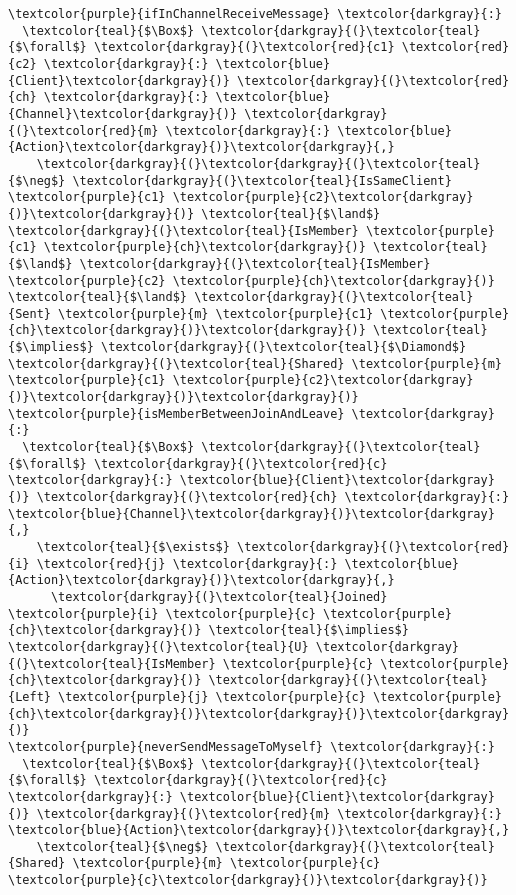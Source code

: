 \begin{Verbatim}[commandchars=\\\{\},codes={\catcode`$=3}]
\textcolor{purple}{ifInChannelReceiveMessage} \textcolor{darkgray}{:} 
  \textcolor{teal}{$\Box$} \textcolor{darkgray}{(}\textcolor{teal}{$\forall$} \textcolor{darkgray}{(}\textcolor{red}{c1} \textcolor{red}{c2} \textcolor{darkgray}{:} \textcolor{blue}{Client}\textcolor{darkgray}{)} \textcolor{darkgray}{(}\textcolor{red}{ch} \textcolor{darkgray}{:} \textcolor{blue}{Channel}\textcolor{darkgray}{)} \textcolor{darkgray}{(}\textcolor{red}{m} \textcolor{darkgray}{:} \textcolor{blue}{Action}\textcolor{darkgray}{)}\textcolor{darkgray}{,} 
    \textcolor{darkgray}{(}\textcolor{darkgray}{(}\textcolor{teal}{$\neg$} \textcolor{darkgray}{(}\textcolor{teal}{IsSameClient} \textcolor{purple}{c1} \textcolor{purple}{c2}\textcolor{darkgray}{)}\textcolor{darkgray}{)} \textcolor{teal}{$\land$} \textcolor{darkgray}{(}\textcolor{teal}{IsMember} \textcolor{purple}{c1} \textcolor{purple}{ch}\textcolor{darkgray}{)} \textcolor{teal}{$\land$} \textcolor{darkgray}{(}\textcolor{teal}{IsMember} \textcolor{purple}{c2} \textcolor{purple}{ch}\textcolor{darkgray}{)} \textcolor{teal}{$\land$} \textcolor{darkgray}{(}\textcolor{teal}{Sent} \textcolor{purple}{m} \textcolor{purple}{c1} \textcolor{purple}{ch}\textcolor{darkgray}{)}\textcolor{darkgray}{)} \textcolor{teal}{$\implies$} \textcolor{darkgray}{(}\textcolor{teal}{$\Diamond$} \textcolor{darkgray}{(}\textcolor{teal}{Shared} \textcolor{purple}{m} \textcolor{purple}{c1} \textcolor{purple}{c2}\textcolor{darkgray}{)}\textcolor{darkgray}{)}\textcolor{darkgray}{)}
\textcolor{purple}{isMemberBetweenJoinAndLeave} \textcolor{darkgray}{:} 
  \textcolor{teal}{$\Box$} \textcolor{darkgray}{(}\textcolor{teal}{$\forall$} \textcolor{darkgray}{(}\textcolor{red}{c} \textcolor{darkgray}{:} \textcolor{blue}{Client}\textcolor{darkgray}{)} \textcolor{darkgray}{(}\textcolor{red}{ch} \textcolor{darkgray}{:} \textcolor{blue}{Channel}\textcolor{darkgray}{)}\textcolor{darkgray}{,} 
    \textcolor{teal}{$\exists$} \textcolor{darkgray}{(}\textcolor{red}{i} \textcolor{red}{j} \textcolor{darkgray}{:} \textcolor{blue}{Action}\textcolor{darkgray}{)}\textcolor{darkgray}{,} 
      \textcolor{darkgray}{(}\textcolor{teal}{Joined} \textcolor{purple}{i} \textcolor{purple}{c} \textcolor{purple}{ch}\textcolor{darkgray}{)} \textcolor{teal}{$\implies$} \textcolor{darkgray}{(}\textcolor{teal}{U} \textcolor{darkgray}{(}\textcolor{teal}{IsMember} \textcolor{purple}{c} \textcolor{purple}{ch}\textcolor{darkgray}{)} \textcolor{darkgray}{(}\textcolor{teal}{Left} \textcolor{purple}{j} \textcolor{purple}{c} \textcolor{purple}{ch}\textcolor{darkgray}{)}\textcolor{darkgray}{)}\textcolor{darkgray}{)}
\textcolor{purple}{neverSendMessageToMyself} \textcolor{darkgray}{:} 
  \textcolor{teal}{$\Box$} \textcolor{darkgray}{(}\textcolor{teal}{$\forall$} \textcolor{darkgray}{(}\textcolor{red}{c} \textcolor{darkgray}{:} \textcolor{blue}{Client}\textcolor{darkgray}{)} \textcolor{darkgray}{(}\textcolor{red}{m} \textcolor{darkgray}{:} \textcolor{blue}{Action}\textcolor{darkgray}{)}\textcolor{darkgray}{,} 
    \textcolor{teal}{$\neg$} \textcolor{darkgray}{(}\textcolor{teal}{Shared} \textcolor{purple}{m} \textcolor{purple}{c} \textcolor{purple}{c}\textcolor{darkgray}{)}\textcolor{darkgray}{)}
\end{Verbatim}
